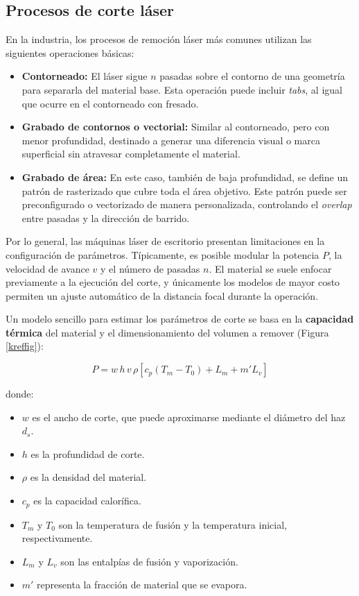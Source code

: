 \subsection{Procesos de corte láser}

En la industria, los procesos de remoción láser más comunes utilizan las siguientes operaciones básicas:

\begin{itemize}
	\item \textbf{Contorneado:} El láser sigue $n$ pasadas sobre el contorno de una geometría para separarla del material base. Esta operación puede incluir \emph{tabs}, al igual que ocurre en el contorneado con fresado.
	\item \textbf{Grabado de contornos o vectorial:} Similar al contorneado, pero con menor profundidad, destinado a generar una diferencia visual o marca superficial sin atravesar completamente el material.
	\item \textbf{Grabado de área:} En este caso, también de baja profundidad, se define un patrón de rasterizado que cubre toda el área objetivo. Este patrón puede ser preconfigurado o vectorizado de manera personalizada, controlando el \emph{overlap} entre pasadas y la dirección de barrido.
\end{itemize}

Por lo general, las máquinas láser de escritorio presentan limitaciones en la configuración de parámetros. Típicamente, es posible modular la potencia $P$, la velocidad de avance $v$ y el número de pasadas $n$. El material se suele enfocar previamente a la ejecución del corte, y únicamente los modelos de mayor costo permiten un ajuste automático de la distancia focal durante la operación.

Un modelo sencillo para estimar los parámetros de corte se basa en la \textbf{capacidad térmica} del material y el dimensionamiento del volumen a remover (Figura \ref{kreffig}):

\begin{equation}
	P = w \, h \, v \, \rho \left[ c_{p}(T_{m}-T_{0}) + L_{m} + m' L_{v} \right]
\end{equation}

donde:  
\begin{itemize}
	\item $w$ es el ancho de corte, que puede aproximarse mediante el diámetro del haz $d_s$.
	\item $h$ es la profundidad de corte.
	\item $\rho$ es la densidad del material.
	\item $c_p$ es la capacidad calorífica.
	\item $T_m$ y $T_0$ son la temperatura de fusión y la temperatura inicial, respectivamente.
	\item $L_m$ y $L_v$ son las entalpías de fusión y vaporización.
	\item $m'$ representa la fracción de material que se evapora.
\end{itemize}

